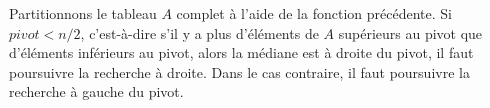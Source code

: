 

\newpage

\Q
Partitionnons le tableau $A$ complet à l'aide de la fonction précédente. Si $\textit{pivot}<n/2$, c'est-à-dire s'il y a plus d'éléments de $A$ supérieurs au pivot que d'éléments inférieurs au pivot, alors la médiane est à droite du pivot, il faut poursuivre la recherche à droite. Dans le cas contraire, il faut poursuivre la recherche à gauche du pivot.



\Fin
